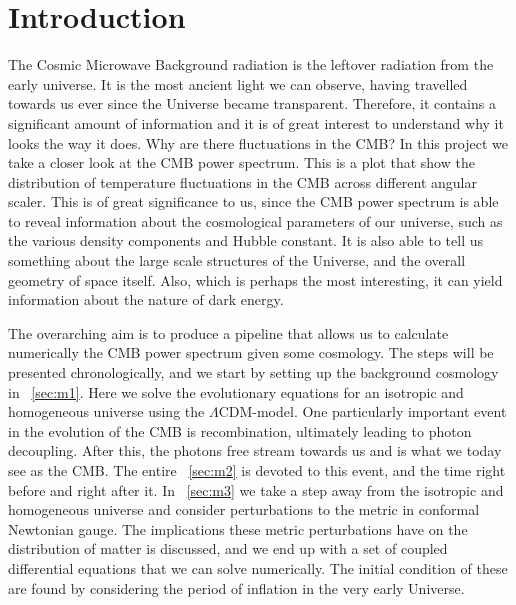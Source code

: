 \section*{Introduction}\label{sec:introduction}

The Cosmic Microwave Background radiation is the leftover radiation from the early universe. It is the most ancient light we can observe, having travelled towards us ever since the Universe became transparent. Therefore, it contains a significant amount of information and it is of great interest to understand why it looks the way it does. Why are there fluctuations in the CMB? In this project we take a closer look at the CMB power spectrum. This is a plot that show the distribution of temperature fluctuations in the CMB across different angular scaler. This is of great significance to us, since the CMB power spectrum is able to reveal information about the cosmological parameters of our universe, such as the various density components and Hubble constant. It is also able to tell us something about the large scale structures of the Universe, and the overall geometry of space itself. Also, which is perhaps the most interesting, it can yield information about the nature of dark energy. 

The overarching aim is to produce a pipeline that allows us to calculate numerically the CMB power spectrum given some cosmology. The steps will be presented chronologically, and we start by setting up the background cosmology in ~\cref{sec:m1}. Here we solve the evolutionary equations for an isotropic and homogeneous universe using the $\Lambda$CDM-model. One particularly important event in the evolution of the CMB is recombination, ultimately leading to photon decoupling. After this, the photons free stream towards us and is what we today see as the CMB. The entire ~\cref{sec:m2} is devoted to this event, and the time right before and right after it. In ~\cref{sec:m3} we take a step away from the isotropic and homogeneous universe and consider perturbations to the metric in conformal Newtonian gauge. The implications these metric perturbations have on the distribution of matter is discussed, and we end up with a set of coupled differential equations that we can solve numerically. The initial condition of these are found by considering the period of inflation in the very early Universe. 

